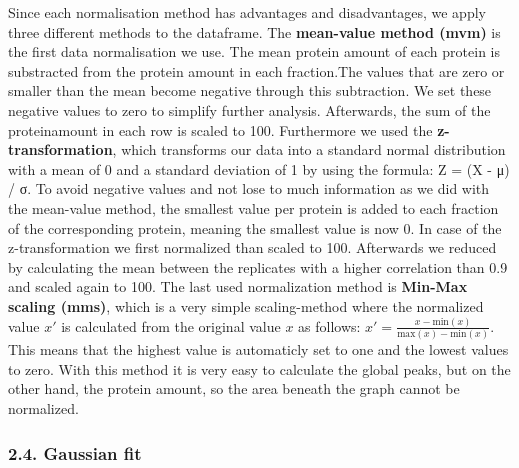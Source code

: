 \documentclass[
  12pt,
]{article}
\begin{document}
\renewcommand{\section}{\titlespacing*{\section}{0pt}{0.3\baselineskip}{0.2\baselineskip}\section}

Since each normalisation method has advantages and disadvantages, we
apply three different methods to the dataframe. The \textbf{mean-value
method (mvm)} is the first data normalisation we use. The mean protein
amount of each protein is substracted from the protein amount in each
fraction.The values that are zero or smaller than the mean become
negative through this subtraction. We set these negative values to zero
to simplify further analysis. Afterwards, the sum of the proteinamount
in each row is scaled to 100. Furthermore we used the
\textbf{z-transformation}, which transforms our data into a standard
normal distribution with a mean of 0 and a standard deviation of 1 by
using the formula: Z = (X - μ) / σ. To avoid negative values and not
lose to much information as we did with the mean-value method, the
smallest value per protein is added to each fraction of the
corresponding protein, meaning the smallest value is now 0. In case of
the z-transformation we first normalized than scaled to 100. Afterwards
we reduced by calculating the mean between the replicates with a higher
correlation than 0.9 and scaled again to 100. The last used
normalization method is \textbf{Min-Max scaling (mms)}, which is a very
simple scaling-method where the normalized value \(x'\) is calculated
from the original value \(x\) as follows:
\(x'=\frac{{x-\text{min}(x)}}{{\text{max}(x)-\text{min}(x)}}\). This
means that the highest value is automaticly set to one and the lowest
values to zero. With this method it is very easy to calculate the global
peaks, but on the other hand, the protein amount, so the area beneath
the graph cannot be normalized.

\hypertarget{gaussian-fit}{%
\subsubsection{2.4. Gaussian fit}\label{gaussian-fit}}

\renewcommand{\section}{\titlespacing*{\section}{0pt}{0.3\baselineskip}{0.2\baselineskip}\section}
\end{document}

